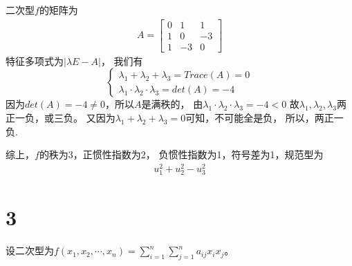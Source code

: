 \documentclass{article}
\begin{document}
\begin{itemize}
\begin{itemize}
                二次型$f$的矩阵为
                \begin{align*}
                  A =
                  \begin{bmatrix}
                    0 & 1  & 1  \\
                    1 & 0  & -3 \\
                    1 & -3 & 0
                  \end{bmatrix}
                \end{align*}
                特征多项式为$|\lambda E - A|$，
                我们有
                \begin{equation*}
                  \begin{cases*}
                    \lambda_1 + \lambda_2 + \lambda_3 = Trace(A) = 0 \\
                    \lambda_1 \cdot \lambda_2 \cdot \lambda_3 = det(A) = -4
                  \end{cases*}
                \end{equation*}
                因为$det(A) = -4 \neq 0$，所以$A$是满秩的，
                由$\lambda_1 \cdot \lambda_2 \cdot \lambda_3 = -4 < 0$
                故$\lambda_1, \lambda_2, \lambda_3$两正一负，或三负。
                又因为$\lambda_1 + \lambda_2 + \lambda_3  = 0$可知，不可能全是负，
                所以，两正一负.

                综上，$f$的秩为3，正惯性指数为2， 负惯性指数为1，符号差为1，规范型为
                \begin{align*}
                  u_1^2 + u_2^2 - u_3^2
                \end{align*}
        \end{itemize}
\end{itemize}


\section*{3}

设二次型为$f(x_1, x_2, \cdots, x_n) = \sum_{i=1}^n \sum_{j=1}^n a_{ij}x_ix_j$。
\end{document}
